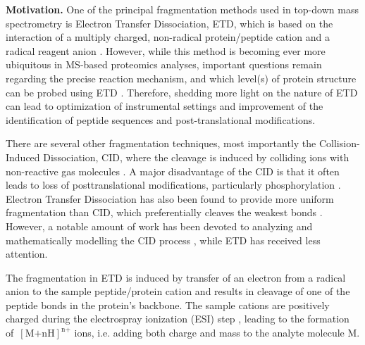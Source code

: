 \documentclass{llncs}
\begin{document}

\textbf{Motivation.} One of the principal fragmentation methods used in top-down mass spectrometry is Electron Transfer Dissociation, ETD, which is based on the interaction of a multiply charged, non-radical protein/peptide cation and a radical reagent anion \cite{Syka2004-rg,Zhurov2013-ua}. However, while this method is becoming ever more ubiquitous in MS-based proteomics analyses, important questions remain regarding the precise reaction mechanism, and which level(s) of protein structure can be probed using ETD \cite{Sohn2009-zv,Sohn2015-rp}. Therefore, shedding more light on the nature of ETD can lead to optimization of instrumental settings and improvement of the identification of peptide sequences and post-translational modifications.

There are several other fragmentation techniques, most importantly the Col\-lision-Induced Dissociation, CID, where the cleavage is induced by colliding ions with non-reactive gas molecules \cite{Mitchell_Wells2005-gn}. A major disadvantage of the CID is that it often leads to loss of posttranslational modifications, particularly phosphorylation \cite{Kim2012-yz}. Electron Transfer Dissociation has also been found to provide more uniform fragmentation than CID, which preferentially cleaves the weakest bonds \cite{Kim2012-yz,Zhurov2013-ua}. However, a notable amount of work has been devoted to analyzing and mathematically modelling the CID process \cite{Zhang2004-fp,Zhang2005-jn,Wysocki2000-am}, while ETD has received less attention.

The fragmentation in ETD is induced by transfer of an electron from a radical anion to the sample peptide/protein cation and results in cleavage of one of the peptide bonds  in the protein’s backbone. The sample cations are positively charged during the electrospray ionization (ESI) step \cite{Fenn1989-mp}, leading to the formation of~$[\text{M+nH}]^\text{n+}$ ions, i.e. adding both charge and mass to the analyte molecule M.
\end{document}
